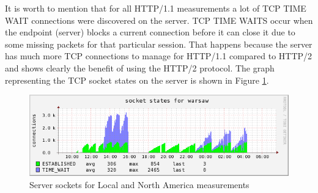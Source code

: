 It is worth to mention that for all HTTP/1.1 measurements a lot of TCP TIME WAIT connections were discovered on the server. TCP TIME WAITS occur when the endpoint (server) blocks a current connection before it can close it due to some missing packets for that particular session. That happens because the server has much more TCP connections to manage for HTTP/1.1 compared to HTTP/2 and shows clearly the benefit of using the HTTP/2 protocol. 
The graph representing the TCP socket states on the server is shown in Figure \ref{fig:sockets}.

\begin{figure}[H]
\centering
\includegraphics[scale=0.6,trim=0.0cm .0cm .0cm .0cm,clip]{images/sockets.png}
\caption{Server sockets for Local and North America measurements}
\label{fig:sockets}
\end{figure}